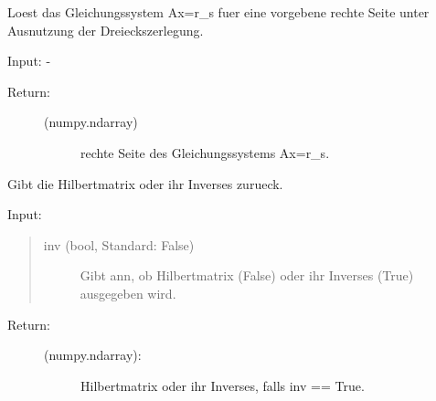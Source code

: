 \documentclass[letterpaper,10pt,ngerman]{sphinxmanual}
\begin{document}
\begin{fulllineitems}
\begin{fulllineitems}
\end{fulllineitems}


\begin{fulllineitems}
\label{\detokenize{index:hilbertmatr.Hilbert.lgs_lsg}}
Loest das Gleichungssystem Ax=r\_s fuer eine vorgebene rechte Seite unter Ausnutzung der
Dreieckszerlegung.

Input: -
\begin{description}
\item[{Return:}] \leavevmode\begin{description}
\item[{(numpy.ndarray)}] \leavevmode
rechte Seite des Gleichungssystems Ax=r\_s.

\end{description}

\end{description}

\end{fulllineitems}


\begin{fulllineitems}
\label{\detokenize{index:hilbertmatr.Hilbert.return_hil_matr}}
Gibt die Hilbertmatrix oder ihr Inverses zurueck.

Input:
\begin{quote}
\begin{description}
\item[{inv (bool, Standard: False)}] \leavevmode
Gibt ann, ob Hilbertmatrix (False) oder ihr Inverses (True) ausgegeben wird.

\end{description}
\end{quote}
\begin{description}
\item[{Return:}] \leavevmode\begin{description}
\item[{(numpy.ndarray):}] \leavevmode
Hilbertmatrix oder ihr Inverses, falls inv == True.

\end{description}

\end{description}

\end{fulllineitems}


\end{fulllineitems}
\end{document}

